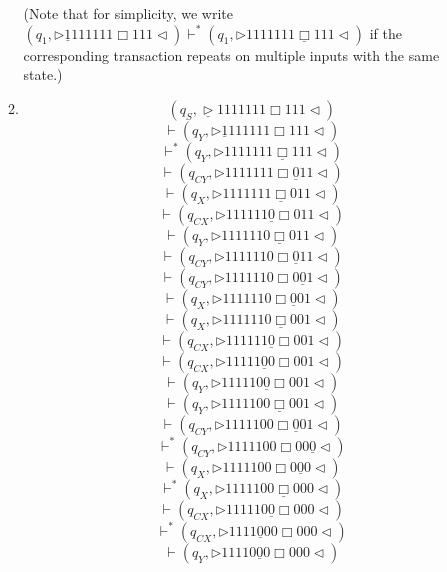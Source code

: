 \documentclass[12pt,a4paper]{article}
\makeatletter
\newtheorem*{solution}{Solution}
\theoremstyle{definition}
\renewenvironment{solution}[1][Solution] {\par\pushQED{\qed}\normalfont\topsep6\p@\@plus6\p@\relax\trivlist\item[\hskip\labelsep\bfseries#1\@addpunct{.}]\ignorespaces}{\popQED\endtrivlist\@endpefalse} \makeatother
\makeatother
\begin{document}
\begin{enumerate}
\begin{enumerate}
	\par{\color{blue}(Note that for simplicity, we write $(q_1,\triangleright  \underline{1}  1  1  1  1  1  1  \Box 1  1  1   \triangleleft)\vdash^* (q_1,\triangleright  1  1  1  1  1  1  1  \underline{\Box} 1  1  1   \triangleleft)$ if the corresponding transaction repeats on multiple inputs with the same state.)}
	\begin{solution}
	$$
	(q_S,\underline{\triangleright}  1  1  1  1  1  1  1  \Box 1  1  1   \triangleleft)
	$$
	$$
	\vdash(q_Y,\triangleright  \underline{1}  1  1  1  1  1  1  \Box 1  1  1   \triangleleft)
	$$
	$$
	\vdash^*(q_Y,\triangleright  1  1  1  1  1  1  1  \underline{\Box} 1  1  1   \triangleleft)
	$$
	$$
	\vdash(q_{CY},\triangleright  1  1  1  1  1  1  1  \Box \underline{0}  1  1   \triangleleft)
	$$
	$$
	\vdash(q_X,\triangleright  1  1  1  1  1  1  1  \underline{\Box} 0  1  1   \triangleleft)
	$$
	$$
	\vdash(q_{CX},\triangleright  1  1  1  1  1  1  \underline{0}  \Box 0  1  1   \triangleleft)
	$$
	$$
	\vdash(q_{Y},\triangleright  1  1  1  1  1  1  0  \underline{\Box} 0  1  1   \triangleleft)
	$$
	$$
	\vdash(q_{CY},\triangleright  1  1  1  1  1  1  0  \Box \underline{0}  1  1   \triangleleft)
	$$
	$$
	\vdash(q_{CY},\triangleright  1  1  1  1  1  1  0  \Box 0  \underline{0}  1   \triangleleft)
	$$
	$$
	\vdash(q_{X},\triangleright  1  1  1  1  1  1  0  \Box \underline{0}  0  1   \triangleleft)
	$$
	$$
	\vdash(q_{X},\triangleright  1  1  1  1  1  1  0  \underline{\Box} 0  0  1   \triangleleft)
	$$
		$$
	\vdash(q_{CX},\triangleright  1  1  1  1  1  1  \underline{0}  \Box 0  0  1   \triangleleft)
	$$
		$$
	\vdash(q_{CX},\triangleright  1  1  1  1  1  \underline{0}  0  \Box 0  0  1   \triangleleft)
	$$
		$$
	\vdash(q_{Y},\triangleright  1  1  1  1  1  0  \underline{0}  \Box 0  0  1   \triangleleft)
	$$
	$$
	\vdash(q_{Y},\triangleright  1  1  1  1  1  0  0  \underline{\Box} 0  0  1   \triangleleft)
	$$
	$$
	\vdash(q_{CY},\triangleright  1  1  1  1  1  0  0  \Box \underline{0}  0  1  \triangleleft)
	$$
	$$
	\vdash^*(q_{CY},\triangleright  1  1  1  1  1  0  0  \Box 0  0  \underline{0}   \triangleleft)
	$$
	$$
	\vdash(q_{X},\triangleright  1  1  1  1  1  0  0  \Box 0  \underline{0}  0   \triangleleft)
	$$
	$$
	\vdash^*(q_{X},\triangleright  1  1  1  1  1  0  0  \underline{\Box} 0  0  0   \triangleleft)
	$$
	$$
	\vdash(q_{CX},\triangleright  1  1  1  1  1  0  \underline{0}  \Box 0  0  0   \triangleleft)
	$$
	$$
	\vdash^*(q_{CX},\triangleright  1  1  1  1  \underline{0}  0  0  \Box 0  0  0   \triangleleft)
	$$
	$$
	\vdash(q_{Y},\triangleright  1  1  1  1  0  \underline{0}  0  \Box 0  0  0   \triangleleft)
$$
\end{solution}
\end{enumerate}
\end{enumerate}
\end{document}
